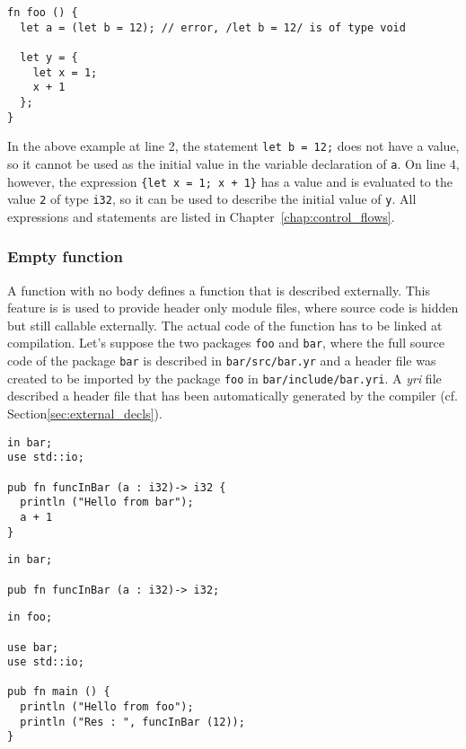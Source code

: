 \begin{lstlisting}[style=coloredverbatim]
fn foo () {
  let a = (let b = 12); // error, /let b = 12/ is of type void

  let y = {
    let x = 1;
    x + 1
  };
}
\end{lstlisting}

In the above example at line 2, the statement \texttt{let b = 12;} does not have
a value, so it cannot be used as the initial value in the variable declaration
of \texttt{a}. On line 4, however, the expression \texttt{\{let x = 1; x + 1\}}
has a value and is evaluated to the value \texttt{2} of type \texttt{i32}, so it
can be used to describe the initial value of \texttt{y}. All expressions and
statements are listed in Chapter~\ref{chap:control_flows}.

\subsubsection{Empty function}

A function with no body defines a function that is described externally. This
feature is is used to provide header only module files, where source code is
hidden but still callable externally. The actual code of the function has to be
linked at compilation. Let's suppose the two packages \texttt{foo} and
\texttt{bar}, where the full source code of the package \texttt{bar} is
described in \texttt{bar/src/bar.yr} and a header file was created to be
imported by the package \texttt{foo} in \texttt{bar/include/bar.yri}. A
\textit{yri} file described a header file that has been automatically generated
by the compiler (cf. Section\ref{sec:external_decls}).


\begin{lstlisting}[caption=\textit{./bar/src/bar.yr}, style=coloredverbatim]
in bar;
use std::io;

pub fn funcInBar (a : i32)-> i32 {
  println ("Hello from bar");
  a + 1
}
\end{lstlisting}

\begin{lstlisting}[caption=\textit{./bar/include/bar.yri}, style=coloredverbatim]
in bar;

pub fn funcInBar (a : i32)-> i32;
\end{lstlisting}
\begin{lstlisting}[caption=\textit{foo.yr}, style=coloredverbatim]
in foo;

use bar;
use std::io;

pub fn main () {
  println ("Hello from foo");
  println ("Res : ", funcInBar (12));
}
\end{lstlisting}


